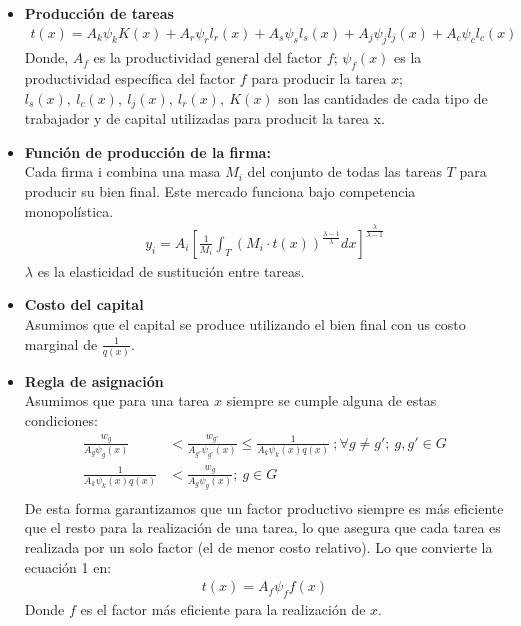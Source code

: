 \documentclass{article}
\theoremstyle{remark}
\theoremstyle{definition}
\begin{document}
\begin{itemize}
    \item \textbf{Producci\'on de tareas}
    \begin{align}
        t(x) =A_{k}\psi_{k}K(x) +A_{r}\psi_{r}l_{r}(x)+A_{s}\psi_{s}l_{s}(x)+A_{j}\psi_{j}l_{j}(x)+A_{c}\psi_{c}l_{c}(x)
    \end{align}
    Donde, $A_{f}$ es la productividad general del factor $f$; $\psi_{f}(x)$ es la productividad espec\'ifica del factor $f$ para producir la tarea $x$; $l_{s}(x), \ l_{c}(x), \ l_{j}(x), \ l_{r}(x), \ K(x)$ son las cantidades de cada tipo de trabajador y de capital utilizadas para producit la tarea x.
    \item \textbf{Funci\'on de producci\'on de la firma:} \\
    Cada firma i combina una masa $M_i$ del conjunto de todas las tareas $T$ para producir su bien final. Este mercado funciona bajo competencia monopol\'istica.
    \begin{align*}
        y_{i} = A_{i} \left[ \frac{1}{M_i} \int_{T} \left( M_{i} \cdot t(x) \right) ^ {\frac{\lambda -1}{\lambda}} dx \right] ^ {\frac{\lambda}{\lambda -1}}
    \end{align*}
    $\lambda$ es la elasticidad de sustituci\'on entre tareas.
    \item \textbf{Costo del capital} \\
    Asumimos que el capital se produce utilizando el bien final con us costo marginal de $\frac{1}{q(x)}$.
    \item \textbf{Regla de asignaci\'on} \\
    Asumimos que para una tarea $x$ siempre se cumple alguna de estas condiciones:
    \begin{align*}
        \frac{w_{g}}{A_{g}\psi_{g}(x)} &< \frac{w_{g'}}{A_{g'}\psi_{g'}(x)} \leq \frac{1}{A_{k}\psi_{k}(x)q(x)} \ ; \forall g \neq g'; \ g,g' \in G \\
        \frac{1}{A_{k}\psi_{k}(x)q(x)} &< \frac{w_{g}}{A_{g}\psi_{g}(x)}; \ g\in G \\
    \end{align*}
    De esta forma garantizamos que un factor productivo siempre es m\'as eficiente que el resto para la realizaci\'on de una tarea, lo que asegura que cada tarea es realizada por un solo factor (el de menor costo relativo). Lo que convierte la ecuaci\'on 1 en:
    \begin{align}
        t(x) =A_{f}\psi_{f}f(x)
    \end{align}
    Donde $f$ es el factor m\'as eficiente para la realizaci\'on de $x$. \\


\end{itemize}
\end{document}

